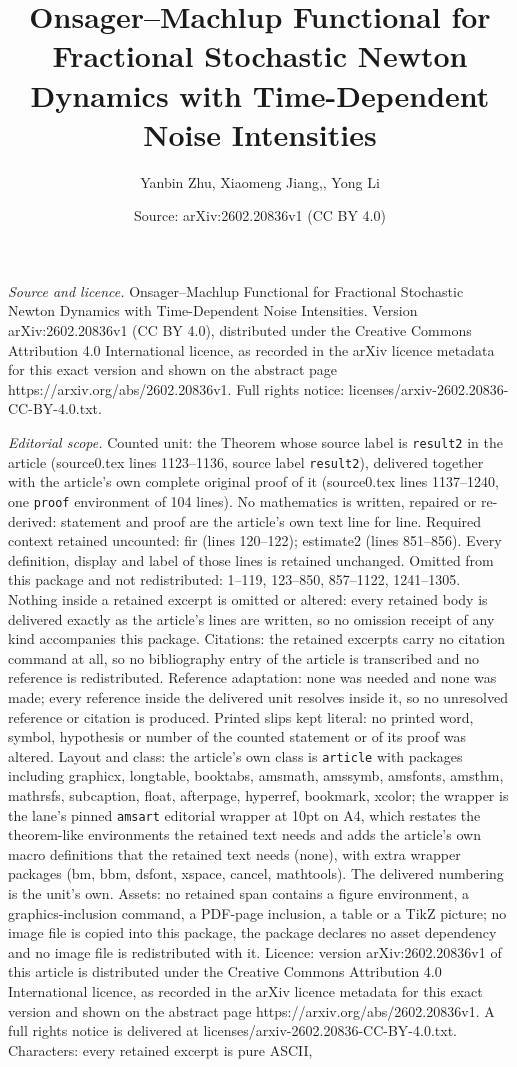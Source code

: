 \documentclass[10pt,a4paper]{amsart}
\title[Onsager--Machlup Functional for Fractional Stochastic Newton]{Onsager--Machlup Functional for Fractional Stochastic Newton Dynamics with Time-Dependent Noise Intensities}
\author{Yanbin Zhu, Xiaomeng Jiang,, Yong Li}
\date{Source: arXiv:2602.20836v1 (CC BY 4.0)}
\begin{document}
\maketitle

\noindent\emph{Source and licence.} Onsager--Machlup Functional for Fractional Stochastic Newton Dynamics with Time-Dependent Noise Intensities. Version arXiv:2602.20836v1 (CC BY 4.0), distributed under the Creative Commons Attribution 4.0 International licence, as recorded in the arXiv licence metadata for this exact version and shown on the abstract page https://arxiv.org/abs/2602.20836v1. Full rights notice: licenses/arxiv-2602.20836-CC-BY-4.0.txt.\par\smallskip

\noindent\textit{Editorial scope.} Counted unit: the Theorem whose source label is \texttt{result2} in the article (source0.tex lines 1123--1136, source label \texttt{result2}), delivered together with the article's own complete original proof of it (source0.tex lines 1137--1240, one \texttt{proof} environment of 104 lines). No mathematics is written, repaired or re-derived: statement and proof are the article's own text line for line. Required context retained uncounted: fir (lines 120--122); estimate2 (lines 851--856). Every definition, display and label of those lines is retained unchanged. Omitted from this package and not redistributed: 1--119, 123--850, 857--1122, 1241--1305. Nothing inside a retained excerpt is omitted or altered: every retained body is delivered exactly as the article's lines are written, so no omission receipt of any kind accompanies this package. Citations: the retained excerpts carry no citation command at all, so no bibliography entry of the article is transcribed and no reference is redistributed. Reference adaptation: none was needed and none was made; every reference inside the delivered unit resolves inside it, so no unresolved reference or citation is produced. Printed slips kept literal: no printed word, symbol, hypothesis or number of the counted statement or of its proof was altered. Layout and class: the article's own class is \texttt{article} with packages including graphicx, longtable, booktabs, amsmath, amssymb, amsfonts, amsthm, mathrsfs, subcaption, float, afterpage, hyperref, bookmark, xcolor; the wrapper is the lane's pinned \texttt{amsart} editorial wrapper at 10pt on A4, which restates the theorem-like environments the retained text needs and adds the article's own macro definitions that the retained text needs (none), with extra wrapper packages (bm, bbm, dsfont, xspace, cancel, mathtools). The delivered numbering is the unit's own. Assets: no retained span contains a figure environment, a graphics-inclusion command, a PDF-page inclusion, a table or a TikZ picture; no image file is copied into this package, the package declares no asset dependency and no image file is redistributed with it. Licence: version arXiv:2602.20836v1 of this article is distributed under the Creative Commons Attribution 4.0 International licence, as recorded in the arXiv licence metadata for this exact version and shown on the abstract page https://arxiv.org/abs/2602.20836v1. A full rights notice is delivered at licenses/arxiv-2602.20836-CC-BY-4.0.txt. Characters: every retained excerpt is pure ASCII, 
\end{document}
